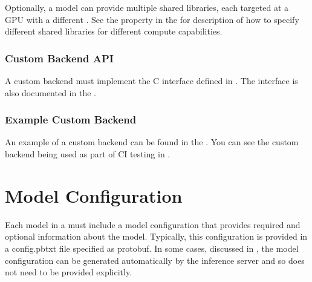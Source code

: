\documentclass[letterpaper,10pt,english]{sphinxmanual}
\begin{document}
Optionally, a model can provide multiple shared libraries, each
targeted at a GPU with a different . See the
 property in the {\hyperref[\detokenize{model_configuration:section-model-configuration}]{}} for description of how to specify
different shared libraries for different compute capabilities.


\subsection{Custom Backend API}
\label{\detokenize{model_repository:custom-backend-api}}
A custom backend must implement the C interface defined in . The
interface is also documented in the .


\subsection{Example Custom Backend}
\label{\detokenize{model_repository:example-custom-backend}}
An example of a custom backend can be found in the . You
can see the custom backend being used as part of CI testing in
.


\chapter{Model Configuration}
\label{\detokenize{model_configuration:model-configuration}}\label{\detokenize{model_configuration:section-model-configuration}}\label{\detokenize{model_configuration::doc}}
Each model in a {\hyperref[\detokenize{model_repository:section-model-repository}]{}} must include a model
configuration that provides required and optional information about
the model. Typically, this configuration is provided in a config.pbtxt
file specified as 
protobuf. In some cases, discussed in
{\hyperref[\detokenize{model_configuration:section-generated-model-configuration}]{}}, the model configuration
can be generated automatically by the inference server and so does not
need to be provided explicitly.
\end{document}
